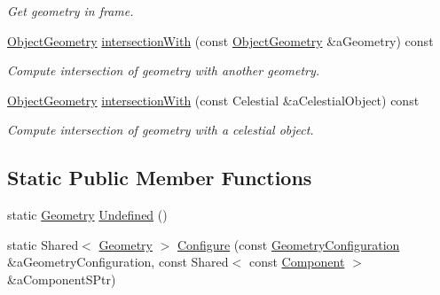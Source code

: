 \begin{DoxyCompactItemize}
\begin{DoxyCompactList}\small\item\em Get geometry in frame. \end{DoxyCompactList}\item 
\hyperlink{namespaceostk_1_1simulation_1_1component_a911837ab7e6f8471e9927a74795a0077}{Object\+Geometry} \hyperlink{classostk_1_1simulation_1_1component_1_1_geometry_a3fe1b4be3ee05faab0ff647697afcd6e}{intersection\+With} (const \hyperlink{namespaceostk_1_1simulation_1_1component_a911837ab7e6f8471e9927a74795a0077}{Object\+Geometry} \&a\+Geometry) const
\begin{DoxyCompactList}\small\item\em Compute intersection of geometry with another geometry. \end{DoxyCompactList}\item 
\hyperlink{namespaceostk_1_1simulation_1_1component_a911837ab7e6f8471e9927a74795a0077}{Object\+Geometry} \hyperlink{classostk_1_1simulation_1_1component_1_1_geometry_ab36a969d150208ea070d214eff3d52d7}{intersection\+With} (const Celestial \&a\+Celestial\+Object) const
\begin{DoxyCompactList}\small\item\em Compute intersection of geometry with a celestial object. \end{DoxyCompactList}\end{DoxyCompactItemize}
\subsection*{Static Public Member Functions}
\begin{DoxyCompactItemize}
\item 
static \hyperlink{classostk_1_1simulation_1_1component_1_1_geometry}{Geometry} \hyperlink{classostk_1_1simulation_1_1component_1_1_geometry_aea7bd504788b09119889a7cc70c88703}{Undefined} ()
\item 
static Shared$<$ \hyperlink{classostk_1_1simulation_1_1component_1_1_geometry}{Geometry} $>$ \hyperlink{classostk_1_1simulation_1_1component_1_1_geometry_acec7bbd02a66a0fba781b4ab259ab7a5}{Configure} (const \hyperlink{structostk_1_1simulation_1_1component_1_1_geometry_configuration}{Geometry\+Configuration} \&a\+Geometry\+Configuration, const Shared$<$ const \hyperlink{classostk_1_1simulation_1_1_component}{Component} $>$ \&a\+Component\+S\+Ptr)
\end{DoxyCompactItemize}
